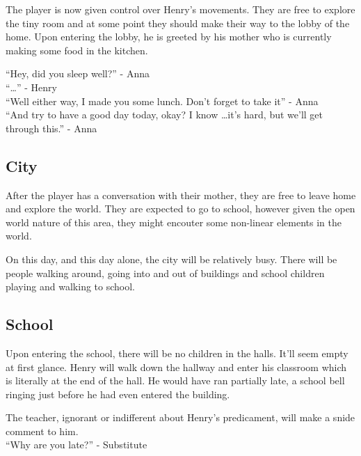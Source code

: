 \documentclass[12pt, a4paper]{article}
\begin{document}
            The player is now given control over Henry's movements. They are free to explore the tiny room and at some point
            they should make their way to the lobby of the home. Upon entering the lobby, he is greeted by his mother who is
            currently making some food in the kitchen.

            ``Hey, did you sleep well?'' - Anna
            \\

            ``\ldots'' - Henry
            \\

            ``Well either way, I made you some lunch. Don't forget to take it'' - Anna
            \\

            ``And try to have a good day today, okay? I know \ldots it's hard, but we'll get through this.'' - Anna

        \subsection{City}

            After the player has a conversation with their mother, they are free to leave home and explore the world. They are
            expected to go to school, however given the open world nature of this area, they might encouter some non-linear elements in the
            world.

            On this day, and this day alone, the city will be relatively busy. There will be people walking around, going into and out of buildings and school children
            playing and walking to school.

        \subsection{School}

            Upon entering the school, there will be no children in the halls. It'll seem empty at first glance. Henry will walk down the hallway and enter 
            his classroom which is literally at the end of the hall. He would have ran partially late, a school bell ringing just before he had even entered the building.

            The teacher, ignorant or indifferent about Henry's predicament, will make a snide comment to him.
            \\

            ``Why are you late?'' - Substitute
            \\
\end{document}
